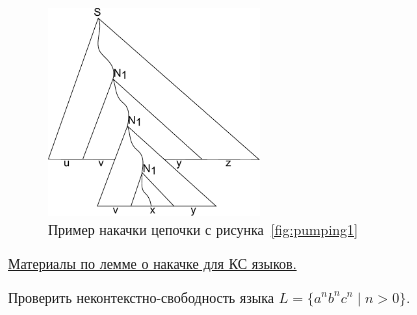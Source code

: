 \begin{figure}
\centering
\includegraphics[width=0.5\textwidth]{figures/pumping_tree_2.pdf}
\caption{Пример накачки цепочки с рисунка~\ref{fig:pumping1}}
\end{figure}


\href{https://neerc.ifmo.ru/wiki/index.php?title=%D0%9B%D0%B5%D0%BC%D0%BC%D0%B0_%D0%BE_%D1%80%D0%B0%D0%B7%D1%80%D0%B0%D1%81%D1%82%D0%B0%D0%BD%D0%B8%D0%B8_%D0%B4%D0%BB%D1%8F_%D0%9A%D0%A1-%D0%B3%D1%80%D0%B0%D0%BC%D0%BC%D0%B0%D1%82%D0%B8%D0%BA}{Материалы по лемме о накачке для КС языков.}

Проверить неконтекстно-свободность языка $L=\{a^nb^nc^n \mid n>0\}$.
